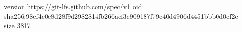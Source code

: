 version https://git-lfs.github.com/spec/v1
oid sha256:98ef4c0e8d28f9d2982814fb266acf3c909187f79c40d4906d4451bbb0d0cf2e
size 3817
